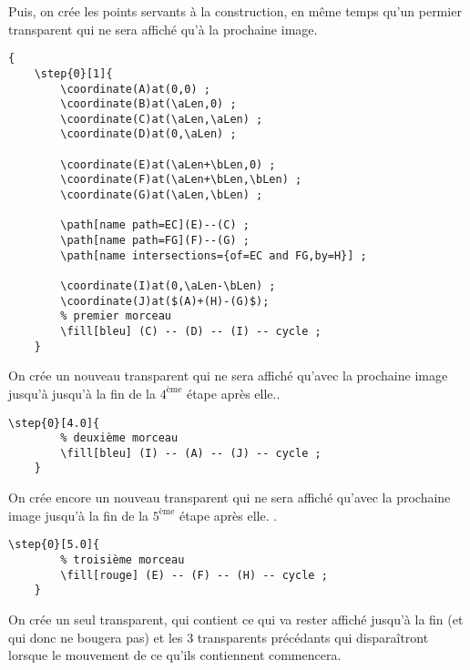 \documentclass[a4paper,12pt]{article}
\begin{document}
Puis, on crée les points servants à la construction, en même temps qu'un permier transparent qui ne sera affiché qu'à la prochaine image.
\begin{lstlisting}[name=exemplecomplet]
{
	\step{0}[1]{		
		\coordinate(A)at(0,0) ;
		\coordinate(B)at(\aLen,0) ;
		\coordinate(C)at(\aLen,\aLen) ;
		\coordinate(D)at(0,\aLen) ;

		\coordinate(E)at(\aLen+\bLen,0) ;
		\coordinate(F)at(\aLen+\bLen,\bLen) ;
		\coordinate(G)at(\aLen,\bLen) ;

		\path[name path=EC](E)--(C) ;
		\path[name path=FG](F)--(G) ;
		\path[name intersections={of=EC and FG,by=H}] ;

		\coordinate(I)at(0,\aLen-\bLen) ;
		\coordinate(J)at($(A)+(H)-(G)$);
		% premier morceau
		\fill[bleu] (C) -- (D) -- (I) -- cycle ;
	}
\end{lstlisting}

On crée un nouveau transparent qui ne sera affiché qu'avec la prochaine image jusqu'à jusqu'à la fin de la $4^\text{ème}$ étape après elle..

\begin{lstlisting}[name=exemplecomplet]
	\step{0}[4.0]{
		% deuxième morceau
		\fill[bleu] (I) -- (A) -- (J) -- cycle ;
	}
\end{lstlisting}

On crée encore un nouveau transparent qui ne sera affiché qu'avec la prochaine image jusqu'à la fin de la $5^\text{ème}$ étape après elle. .

\begin{lstlisting}[name=exemplecomplet]
	\step{0}[5.0]{
		% troisième morceau
		\fill[rouge] (E) -- (F) -- (H) -- cycle ;
	}
\end{lstlisting}

On crée un seul transparent, qui contient ce qui va rester affiché jusqu'à la fin (et qui donc ne bougera pas) et les 3 transparents précédants qui disparaîtront lorsque le mouvement de ce qu'ils 
contiennent commencera.
\end{document}
